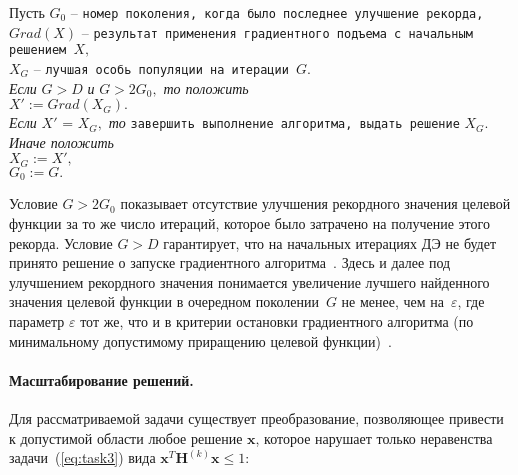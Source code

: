 \begin{flushleft}
\small
Пусть
$G_0$ -- \verb"номер поколения, когда было последнее улучшение рекорда,"\\
$Grad(X)$ -- \verb"результат применения градиентного подъема с начальным решением "$X,$\\
$X_G$ -- \verb"лучшая особь популяции на итерации "$G.$\\
$\mbox{ }$\\

\textit{Если} $G > D$ \textit{и} $G > 2 G_0,$ \textit{то положить} \\
\leftskip=12pt
    $X' := Grad(X_G).$\\
    \textit{Если} $X'$ = $X_G,$ \textit{то} \verb"завершить выполнение алгоритма, выдать решение" $X_G.$\\
    \textit{Иначе положить} \\
    \leftskip=24pt
        $X_G := X',$\\
        $G_0 := G.$\\
        \leftskip=12pt
\end{flushleft}
Условие $G > 2 G_0$ показывает отсутствие улучшения рекордного значения целевой функции за то же число итераций,
которое было затрачено на получение этого рекорда.
Условие $G > D$ гарантирует, что на начальных итерациях ДЭ не будет принято решение о запуске градиентного
алгоритма~\cite{eremeev:restart}. Здесь и далее под улучшением рекордного значения понимается увеличение лучшего
найденного значения целевой функции в очередном поколении~$G$ не менее, чем на~$\varepsilon$, где параметр $\varepsilon$
тот же, что и в критерии остановки градиентного алгоритма (по минимальному допустимому приращению целевой функции)~\cite{tyu:daor}.

\paragraph*{Масштабирование решений.}
Для рассматриваемой задачи существует преобразование, позволяющее привести к
допустимой области любое решение $\textbf{x}$, которое нарушает только неравенства задачи~(\ref{eq:task3}) вида
$\textbf{x}^{T}\textbf{H}^{(k)}\textbf{x} \leq 1$:

